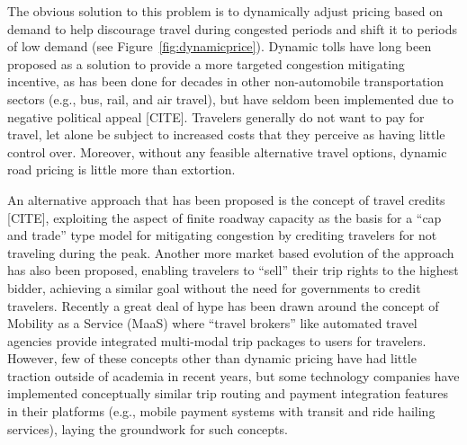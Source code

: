 \documentclass[10pt, letter, twocolumn]{article} %
\begin{document}
The obvious solution to this problem is to dynamically adjust pricing based on demand to help discourage travel during congested periods and shift it to periods of low demand (see Figure~\ref{fig:dynamicprice}). Dynamic tolls have long been proposed as a solution to provide a more targeted congestion mitigating incentive, as has been done for decades in other non-automobile transportation sectors (e.g., bus, rail, and air travel), but have seldom been implemented due to negative political appeal [CITE]. Travelers generally do not want to pay for travel, let alone be subject to increased costs that they perceive as having little control over. Moreover, without any feasible alternative travel options, dynamic road pricing is little more than extortion. 

An alternative approach that has been proposed is the concept of travel credits [CITE], exploiting the aspect of finite roadway capacity as the basis for a ``cap and trade'' type model for mitigating congestion by crediting travelers for not traveling during the peak. Another more market based evolution of the approach has also been proposed, enabling travelers to ``sell'' their trip rights to the highest bidder, achieving a similar goal without the need for governments to credit travelers. Recently a great deal of hype has been drawn around the concept of Mobility as a Service (MaaS) where ``travel brokers'' like automated travel agencies provide integrated multi-modal trip packages to users for travelers. However, few of these concepts other than dynamic pricing have had little traction outside of academia in recent years, but some technology companies have implemented conceptually similar trip routing and payment integration features in their platforms (e.g., mobile payment systems with transit and ride hailing services), laying the groundwork for such concepts. 
\end{document}
